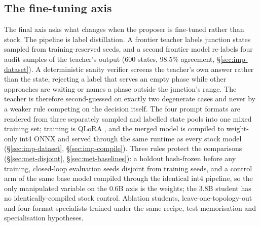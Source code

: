 \subsection{The fine-tuning axis}\label{sec:des-ft}
The final axis asks what changes when the proposer is fine-tuned rather
than stock. The pipeline is label distillation. A frontier teacher labels
junction states sampled from training-reserved seeds, and a second frontier
model re-labels four audit samples of the teacher's output (600 states,
98.5\% agreement, \S\ref{sec:imp-dataset}). A deterministic sanity
verifier screens the teacher's own answer rather than the state, rejecting
a label that serves an empty phase while other approaches are waiting or
names a phase outside the junction's range. The teacher is therefore
second-guessed on exactly two degenerate cases and never by a weaker rule
competing on the decision itself. The four prompt formats are rendered
from three separately sampled and labelled state pools into one mixed
training set; training is QLoRA \cite{dettmers2023qlora}, and the merged
model is compiled to weight-only int4 ONNX and served through the same
runtime as every stock model (\S\ref{sec:imp-dataset},
\S\ref{sec:imp-compile}). Three rules protect the comparisons
(\S\ref{sec:met-disjoint}, \S\ref{sec:met-baselines}): a holdout
hash-frozen before any training, closed-loop evaluation seeds disjoint from
training seeds, and a control arm of the same base model compiled through
the identical int4 pipeline, so the only manipulated variable on the 0.6B
axis is the weights; the 3.8B student has no identically-compiled stock
control. Ablation students, leave-one-topology-out and four format
specialists trained under the same recipe, test memorisation and
specialisation hypotheses.
